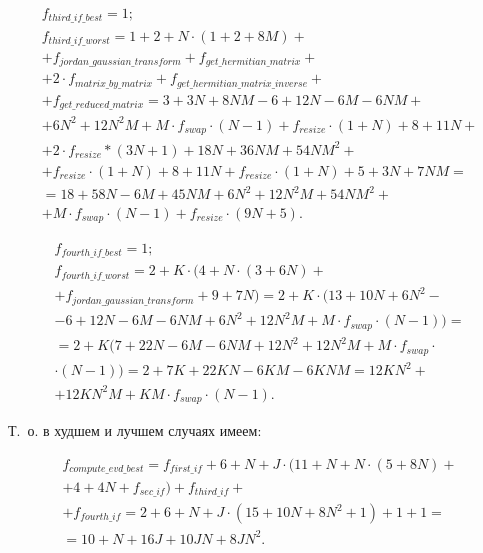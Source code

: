 \begin{equation}
	\begin{gathered}
		f_{third\_if\_best} = 1;\\
		f_{third\_if\_worst} = 1 + 2 + N \cdot (1 + 2 + 8M) +\\+ f_{jordan\_gaussian\_transform} + f_{get\_hermitian\_matrix} +\\+ 2 \cdot f_{matrix\_by\_matrix} + f_{get\_hermitian\_matrix\_inverse} +\\+ f_{get\_reduced\_matrix} = 3 + 3N + 8NM -6 + 12N - 6M - 6NM +\\+ 6N^2 + 12N^2M + M \cdot f_{swap} \cdot (N - 1) + f_{resize} \cdot (1 + N) + 8 + 11N +\\+ 2 \cdot f_{resize} * (3N + 1) + 18N + 36NM + 54NM^2 +\\+ f_{resize} \cdot (1 + N) + 8 + 11N + f_{resize} \cdot (1 + N) + 5 + 3N + 7NM =\\= 18 + 58N - 6M + 45NM + 6N^2 + 12N^2M + 54NM^2 +\\+ M \cdot f_{swap} \cdot (N - 1) + f_{resize} \cdot (9N + 5).
	\end{gathered}
\end{equation}

\begin{equation}
	\begin{gathered}
		f_{fourth\_if\_best} = 1;\\
		f_{fourth\_if\_worst} = 2 + K \cdot (4 + N \cdot (3 + 6N) +\\+ f_{jordan\_gaussian\_transform} + 9 + 7N) = 2 + K \cdot (13 + 10N + 6N^2 -\\- 6 + 12N - 6M - 6NM + 6N^2 + 12N^2M + M \cdot f_{swap} \cdot (N - 1)) =\\= 2 + K (7 + 22N - 6M - 6NM + 12N^2 + 12N^2M + M \cdot f_{swap} \cdot\\\cdot (N-1)) = 2 + 7K + 22KN - 6KM - 6KNM =12KN^2 +\\+ 12KN^2M + KM \cdot f_{swap} \cdot (N - 1).
	\end{gathered}
\end{equation}

Т.~о. в худшем и лучшем случаях имеем:

\begin{equation}
	\begin{gathered}
		f_{compute\_evd\_best} = f_{first\_if} + 6 + N + J \cdot (11 + N + N \cdot (5 + 8N) + \\
		+ 4 + 4N + f_{sec\_if}) + f_{third\_if} +\\+ f_{fourth\_if} = 2 + 6 + N + J \cdot (15 + 10N + 8N^2 + 1) + 1 + 1 = \\
		= 10 + N + 16J + 10JN + 8JN^2.
	\end{gathered}
\end{equation}


